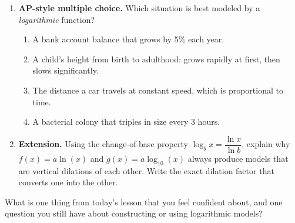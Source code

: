 \documentclass[10pt]{article}
\begin{document}
\begin{enumerate}[leftmargin=1.8em, itemsep=14pt]
\begin{enumerate}[leftmargin=1.5em, itemsep=8pt, label=\alph*.]
  \vspace{4pt}
  Domain: \blank{5cm}

  \item Evaluate $f(5)$.

  \vspace{4pt}
  $f(5) = 2\log_2(5-1)+3 = 2\log_2(\blank{1cm})+3 = 2\cdot\blank{1cm}+3 = $ \blank{2cm}

  \item Solve $f(x) = 7$ for $x$. Show all steps.

  \vspace{4pt}
  $x = $ \blank{3cm}
\end{enumerate}

\item \textbf{AP-style multiple choice.} Which situation is best modeled by a
      \emph{logarithmic} function?

\vspace{6pt}
\begin{enumerate}[leftmargin=2em, itemsep=4pt, label=(\Alph*)]
  \item A bank account balance that grows by 5\% each year.
  \item A child's height from birth to adulthood: grows rapidly at first, then slows
        significantly.
  \item The distance a car travels at constant speed, which is proportional to time.
  \item A bacterial colony that triples in size every 3 hours.
\end{enumerate}

\item \textbf{Extension.} Using the change-of-base property $\log_b x = \dfrac{\ln x}{\ln b}$,
      explain why $f(x) = a\ln(x)$ and $g(x) = a\log_{10}(x)$ always produce models that
      are vertical dilations of each other. Write the exact dilation factor that converts
      one into the other.


\end{enumerate}

\vspace{0.12in}

\begin{reflectionbox}
What is one thing from today's lesson that you feel confident about, and one question you
still have about constructing or using logarithmic models?

\end{reflectionbox}
\end{document}
